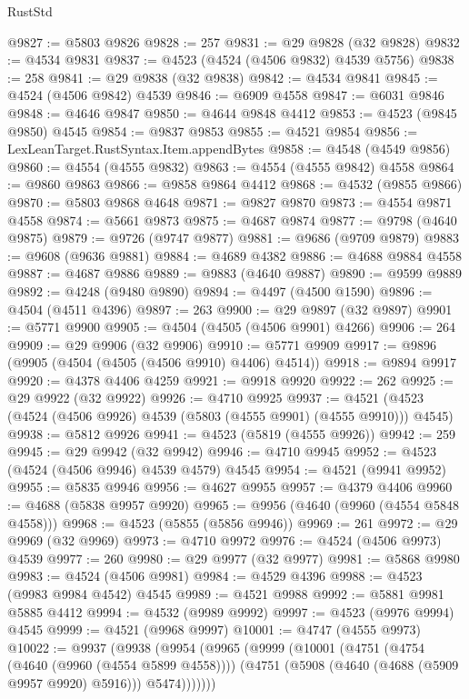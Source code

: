 \begin{lexlean}{RustStd}
\begin{coremodule}
@9827 := @5803 @9826
@9828 := 257
@9831 := @29 @9828 (@32 @9828)
@9832 := @4534 @9831
@9837 := @4523 (@4524 (@4506 @9832) @4539 @5756)
@9838 := 258
@9841 := @29 @9838 (@32 @9838)
@9842 := @4534 @9841
@9845 := @4524 (@4506 @9842) @4539
@9846 := @6909 @4558
@9847 := @6031 @9846
@9848 := @4646 @9847
@9850 := @4644 @9848 @4412
@9853 := @4523 (@9845 @9850) @4545
@9854 := @9837 @9853
@9855 := @4521 @9854
@9856 := LexLeanTarget.RustSyntax.Item.appendBytes
@9858 := @4548 (@4549 @9856)
@9860 := @4554 (@4555 @9832)
@9863 := @4554 (@4555 @9842) @4558
@9864 := @9860 @9863
@9866 := @9858 @9864 @4412
@9868 := @4532 (@9855 @9866)
@9870 := @5803 @9868 @4648
@9871 := @9827 @9870
@9873 := @4554 @9871 @4558
@9874 := @5661 @9873
@9875 := @4687 @9874
@9877 := @9798 (@4640 @9875)
@9879 := @9726 (@9747 @9877)
@9881 := @9686 (@9709 @9879)
@9883 := @9608 (@9636 @9881)
@9884 := @4689 @4382
@9886 := @4688 @9884 @4558
@9887 := @4687 @9886
@9889 := @9883 (@4640 @9887)
@9890 := @9599 @9889
@9892 := @4248 (@9480 @9890)
@9894 := @4497 (@4500 @1590)
@9896 := @4504 (@4511 @4396)
@9897 := 263
@9900 := @29 @9897 (@32 @9897)
@9901 := @5771 @9900
@9905 := @4504 (@4505 (@4506 @9901) @4266)
@9906 := 264
@9909 := @29 @9906 (@32 @9906)
@9910 := @5771 @9909
@9917 := @9896 (@9905 (@4504 (@4505 (@4506 @9910) @4406) @4514))
@9918 := @9894 @9917
@9920 := @4378 @4406 @4259
@9921 := @9918 @9920
@9922 := 262
@9925 := @29 @9922 (@32 @9922)
@9926 := @4710 @9925
@9937 := @4521 (@4523 (@4524 (@4506 @9926) @4539 (@5803 (@4555 @9901) (@4555 @9910))) @4545)
@9938 := @5812 @9926
@9941 := @4523 (@5819 (@4555 @9926))
@9942 := 259
@9945 := @29 @9942 (@32 @9942)
@9946 := @4710 @9945
@9952 := @4523 (@4524 (@4506 @9946) @4539 @4579) @4545
@9954 := @4521 (@9941 @9952)
@9955 := @5835 @9946
@9956 := @4627 @9955
@9957 := @4379 @4406
@9960 := @4688 (@5838 @9957 @9920)
@9965 := @9956 (@4640 (@9960 (@4554 @5848 @4558)))
@9968 := @4523 (@5855 (@5856 @9946))
@9969 := 261
@9972 := @29 @9969 (@32 @9969)
@9973 := @4710 @9972
@9976 := @4524 (@4506 @9973) @4539
@9977 := 260
@9980 := @29 @9977 (@32 @9977)
@9981 := @5868 @9980
@9983 := @4524 (@4506 @9981)
@9984 := @4529 @4396
@9988 := @4523 (@9983 @9984 @4542) @4545
@9989 := @4521 @9988
@9992 := @5881 @9981 @5885 @4412
@9994 := @4532 (@9989 @9992)
@9997 := @4523 (@9976 @9994) @4545
@9999 := @4521 (@9968 @9997)
@10001 := @4747 (@4555 @9973)
@10022 := @9937
    (@9938
      (@9954
        (@9965
          (@9999
            (@10001
              (@4751
                (@4754 (@4640 (@9960 (@4554 @5899 @4558))))
                (@4751 (@5908 (@4640 (@4688 (@5909 @9957 @9920) @5916))) @5474)))))))

\end{coremodule}
\end{lexlean}
